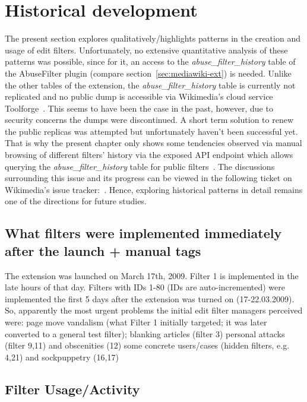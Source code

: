 \section{Historical development}
\label{sec:5-history}

The present section explores qualitatively/highlights patterns in the creation and usage of edit filters.
Unfortunately, no extensive quantitative analysis of these patterns was possible, since for it, an access to the \emph{abuse\_filter\_history} table of the AbuseFilter plugin (compare section~\ref{sec:mediawiki-ext}) is needed.
Unlike the other tables of the extension, the \emph{abuse\_filter\_history} table is currently not replicated and no public dump is accessible via Wikimedia's cloud service Toolforge~\cite{Wikimedia:Toolforge}.
This seems to have been the case in the past, however, due to security concerns the dumps were discontinued.
A short term solution to renew the public replicas was attempted but unfortunately haven't been successful yet.
That is why the present chapter only shows some tendencies observed via manual browsing of different filters' history via the exposed API endpoint which allows querying the \emph{abuse\_filter\_history} table for public filters~\cite{Wikipedia:AbuseFilterHistory}.
The discussions surrounding this issue and its progress can be viewed in the following ticket on Wikimedia's issue tracker:~\cite{phabricator}.
Hence, exploring historical patterns in detail remains one of the directions for future studies.

\subsection{What filters were implemented immediately after the launch + manual tags}
The extension was launched on March 17th, 2009.
Filter 1 is implemented in the late hours of that day.
Filters with IDs 1-80 (IDs are auto-incremented) were implemented the first 5 days after the extension was turned on (17-22.03.2009).
So, apparently the most urgent problems the initial edit filter managers perceived were:
page move vandalism (what Filter 1 initially targeted; it was later converted to a general test filter);
blanking articles (filter 3)
personal attacks (filter 9,11) and obscenities (12)
some concrete users/cases (hidden filters, e.g. 4,21) and sockpuppetry (16,17)

\subsection{Filter Usage/Activity}

